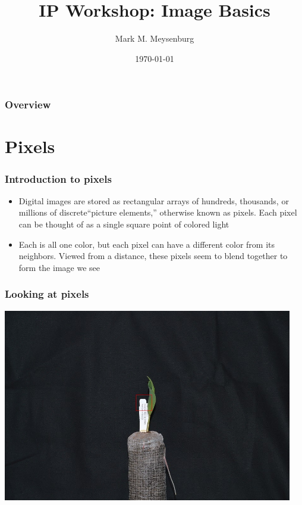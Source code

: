 \documentclass{beamer}
\title[Image Basics]{IP Workshop: Image Basics} %
\author{Mark M. Meysenburg} %
\institute[Doane DIVAS] %
{
Doane University \\ %
\medskip
\textit{mark.meysenburg@doane.edu} %
}
\date{\today} %
\begin{document}
\begin{frame}
\titlepage %
\end{frame}

\begin{frame}
\frametitle{Overview} 
\tableofcontents 
\end{frame}


\section{Pixels}

\begin{frame}
	\frametitle{Introduction to pixels}

	\begin{itemize}
		\item Digital images are stored as rectangular arrays of hundreds, thousands, or millions of discrete``picture elements,'' otherwise known as pixels. Each pixel can be thought of as a single square point of colored light
		\item Each is all one color, but each pixel can have a different color from its neighbors. Viewed from a distance, these pixels seem to blend together to form the image we see
	\end{itemize}
\end{frame}

\begin{frame}
	\frametitle{Looking at pixels}

	\includegraphics[width=0.95\textwidth]{../../fig/01-original.jpg}
\end{frame}
\end{document}
